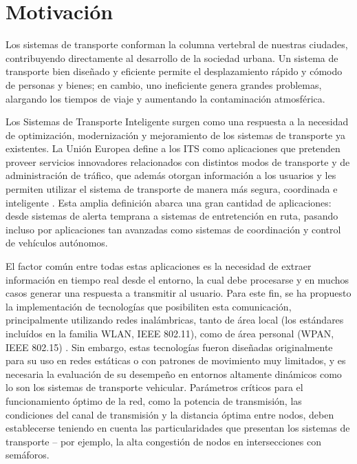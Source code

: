 \section{Motivación}

Los sistemas de transporte conforman la columna vertebral de nuestras ciudades, contribuyendo directamente al desarrollo de la sociedad urbana. Un sistema de transporte bien diseñado y eficiente permite el desplazamiento rápido y cómodo de personas y bienes; en cambio, uno ineficiente genera grandes problemas, alargando los tiempos de viaje y aumentando la contaminación atmosférica.

Los Sistemas de Transporte Inteligente surgen como una respuesta a la necesidad de optimización, modernización y mejoramiento de los sistemas de transporte ya existentes. La Unión Europea define a los ITS como aplicaciones que pretenden proveer servicios innovadores relacionados con distintos modos de transporte y de administración de tráfico, que además otorgan información a los usuarios y les permiten utilizar el sistema de transporte de manera más segura, coordinada e inteligente \cite{eudirective}. Esta amplia definición abarca una gran cantidad de aplicaciones: desde sistemas de alerta temprana a sistemas de entretención en ruta, pasando incluso por aplicaciones tan avanzadas como sistemas de coordinación y control de vehículos autónomos.


El factor común entre todas estas aplicaciones es la necesidad de extraer información en tiempo real desde el entorno, la cual debe procesarse y en muchos casos generar una respuesta a transmitir al usuario. Para este fin, se ha propuesto la implementación de tecnologías que posibiliten esta comunicación, principalmente utilizando redes inalámbricas, tanto de área local (los estándares incluídos en la familia WLAN, IEEE 802.11), como de área personal (WPAN, IEEE 802.15) \cite{80211dailey,80215vanet,80211wave}. Sin embargo, estas tecnologías fueron diseñadas originalmente para su uso en redes estáticas o con patrones de movimiento muy limitados, y es necesaria la evaluación de su desempeño en entornos altamente dinámicos como lo son los sistemas de transporte vehicular. Parámetros críticos para el funcionamiento óptimo de la red, como la potencia de transmisión, las condiciones del canal de transmisión y la distancia óptima entre nodos, deben establecerse teniendo en cuenta las particularidades que presentan los sistemas de transporte -- por ejemplo, la alta congestión de nodos en intersecciones con semáforos.

